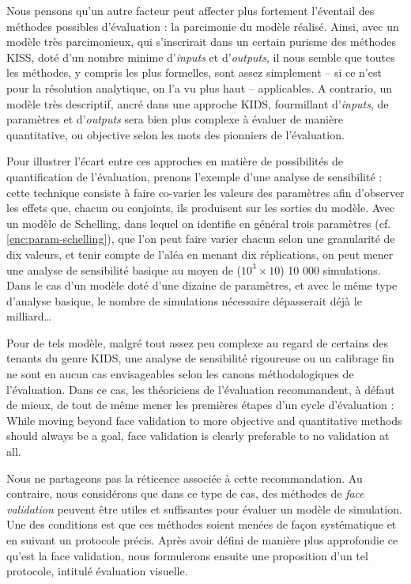 Nous pensons qu'un autre facteur peut affecter plus fortement l'éventail des méthodes possibles d'évaluation : la parcimonie du modèle réalisé.
Ainsi, avec un modèle très parcimonieux, qui s'inscrirait dans un certain purisme des méthodes \og KISS\fg{}, doté d'un nombre minime d'\textit{inputs} et d'\textit{outputs}, il nous semble que toutes les méthodes, y compris les plus formelles, sont assez simplement -- si ce n'est pour la résolution analytique, on l'a vu plus haut -- applicables.
A contrario, un modèle très descriptif, ancré dans une approche \og KIDS\fg{}, fourmillant d'\textit{inputs}, de paramètres et d'\textit{outputs} sera bien plus complexe à évaluer de manière quantitative, ou \og objective\fg{} selon les mots des pionniers de l'évaluation.

Pour illustrer l'écart entre ces approches en matière de possibilités de quantification de l'évaluation, prenons l'exemple d'une analyse de sensibilité :
	cette technique consiste à faire co-varier les valeurs des paramètres afin d'observer les effets que, chacun ou conjoints, ils produisent sur les sorties du modèle.
Avec un modèle de Schelling, dans lequel on identifie en général trois paramètres (cf. \cref{enc:param-schelling}), que l'on peut faire varier chacun selon une granularité de dix valeurs, et tenir compte de l'aléa en menant dix réplications, on peut mener une analyse de sensibilité basique au moyen de ($10^3 \times 10$) 10 000 simulations.
Dans le cas d'un modèle doté d'une dizaine de paramètres, et avec le même type d'analyse basique, le nombre de simulations nécessaire dépasserait déjà le milliard\ldots

Pour de tels modèle, malgré tout assez peu complexe au regard de certains des tenants du genre KIDS, une analyse de sensibilité rigoureuse ou un calibrage fin ne sont en aucun cas envisageables selon les canons méthodologiques de l'évaluation.
Dans ce cas, les théoriciens de l'évaluation recommandent, à défaut de mieux, de tout de même mener les premières étapes d'un cycle d'évaluation \autocite[342]{petty2010verification} :
	\og While moving beyond face validation to more objective and quantitative methods should always be a goal, face validation is clearly preferable to no validation at all.\fg{}

Nous ne partageons pas la réticence associée à cette recommandation.
Au contraire, nous considérons que dans ce type de cas, des méthodes de \og \textit{face validation}\fg{} peuvent être utiles et suffisantes pour évaluer un modèle de simulation.
Une des conditions est que ces méthodes soient menées de façon systématique et en suivant un protocole précis.
Après avoir défini de manière plus approfondie ce qu'est la face validation, nous formulerons ensuite une proposition d'un tel protocole, intitulé \og évaluation visuelle\fg{}.


